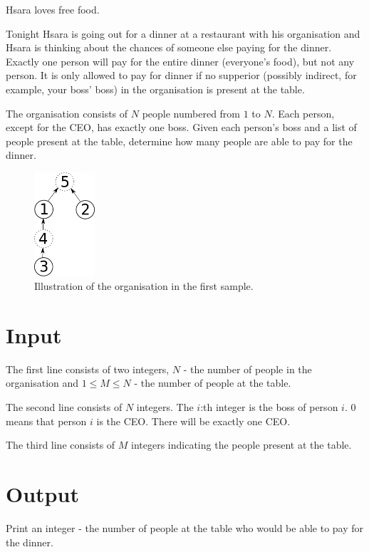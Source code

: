Hsara loves free food.

Tonight Hsara is going out for a dinner at a restaurant with his organisation and Hsara is thinking about the chances of someone else paying for the dinner. Exactly one person will pay for the entire dinner (everyone's food), but not any person. It is only allowed to pay for dinner if no supperior (possibly indirect, for example, your boss' boss) in the organisation is present at the table.

The organisation consists of $N$ people numbered from $1$ to $N$. Each person, except for the CEO, has exactly one boss. Given each person's boss and a list of people present at the table, determine how many people are able to pay for the dinner.

\begin{figure}[h!]
	\begin{center}
		\includegraphics[width=0.2\textwidth]{tree.png}
		\caption{Illustration of the organisation in the first sample.}
	\end{center}
\end{figure}


\section*{Input}
The first line consists of two integers, $N$ - the number of people in the organisation and $1 \le M \le N$ - the number of people at the table.

The second line consists of $N$ integers. The $i$:th integer is the boss of person $i$. 0 means that person $i$ is the CEO. There will be exactly one CEO.

The third line consists of $M$ integers indicating the people present at the table.

\section*{Output}
Print an integer - the number of people at the table who would be able to pay for the dinner.

